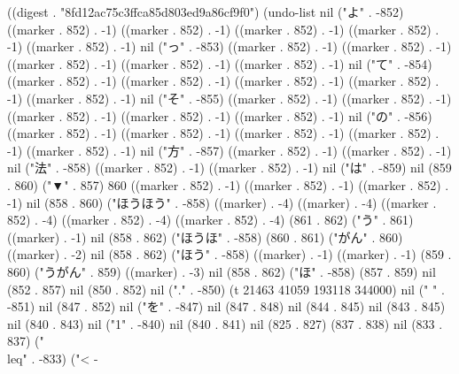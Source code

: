 
((digest . "8fd12ac75c3ffca85d803ed9a86cf9f0") (undo-list nil ("よ" . -852) ((marker . 852) . -1) ((marker . 852) . -1) ((marker . 852) . -1) ((marker . 852) . -1) ((marker . 852) . -1) nil ("っ" . -853) ((marker . 852) . -1) ((marker . 852) . -1) ((marker . 852) . -1) ((marker . 852) . -1) ((marker . 852) . -1) nil ("て" . -854) ((marker . 852) . -1) ((marker . 852) . -1) ((marker . 852) . -1) ((marker . 852) . -1) ((marker . 852) . -1) nil ("そ" . -855) ((marker . 852) . -1) ((marker . 852) . -1) ((marker . 852) . -1) ((marker . 852) . -1) ((marker . 852) . -1) nil ("の" . -856) ((marker . 852) . -1) ((marker . 852) . -1) ((marker . 852) . -1) ((marker . 852) . -1) ((marker . 852) . -1) nil ("方" . -857) ((marker . 852) . -1) ((marker . 852) . -1) nil ("法" . -858) ((marker . 852) . -1) ((marker . 852) . -1) nil ("は" . -859) nil (859 . 860) ("▼" . 857) 860 ((marker . 852) . -1) ((marker . 852) . -1) ((marker . 852) . -1) nil (858 . 860) ("ほうほう" . -858) ((marker) . -4) ((marker) . -4) ((marker . 852) . -4) ((marker . 852) . -4) ((marker . 852) . -4) (861 . 862) ("う" . 861) ((marker) . -1) nil (858 . 862) ("ほうほ" . -858) (860 . 861) ("がん" . 860) ((marker) . -2) nil (858 . 862) ("ほう" . -858) ((marker) . -1) ((marker) . -1) (859 . 860) ("うがん" . 859) ((marker) . -3) nil (858 . 862) ("ほ" . -858) (857 . 859) nil (852 . 857) nil (850 . 852) nil ("." . -850) (t 21463 41059 193118 344000) nil (" " . -851) nil (847 . 852) nil ("を" . -847) nil (847 . 848) nil (844 . 845) nil (843 . 845) nil (840 . 843) nil ("1" . -840) nil (840 . 841) nil (825 . 827) (837 . 838) nil (833 . 837) ("\\leq" . -833) ("<
-
